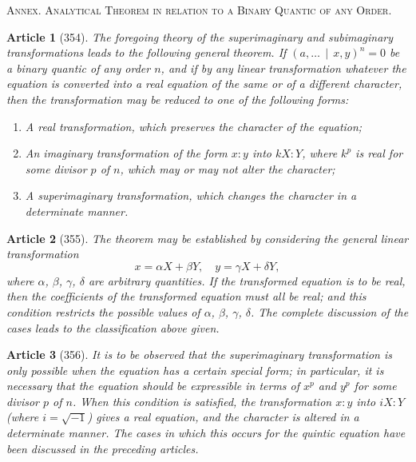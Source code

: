 \documentclass[11pt,a4paper]{article}
\theoremstyle{cayley}
\newtheorem{art}{Article}
\begin{document}
\begin{center}
\textsc{Annex. Analytical Theorem in relation to a Binary Quantic of any Order.}
\end{center}

\begin{art}[354]
The foregoing theory of the superimaginary and subimaginary transformations leads to the following general theorem. If $(a, \ldots \,\mid\, x, y)^n = 0$ be a binary quantic of any order $n$, and if by any linear transformation whatever the equation is converted into a real equation of the same or of a different character, then the transformation may be reduced to one of the following forms:
\begin{enumerate}[label=\arabic*.,itemsep=2pt]
\item A real transformation, which preserves the character of the equation;
\item An imaginary transformation of the form $x:y$ into $kX:Y$, where $k^p$ is real for some divisor $p$ of $n$, which may or may not alter the character;
\item A superimaginary transformation, which changes the character in a determinate manner.
\end{enumerate}
\end{art}

\begin{art}[355]
The theorem may be established by considering the general linear transformation
\[
x = \alpha X + \beta Y, \quad y = \gamma X + \delta Y,
\]
where $\alpha$, $\beta$, $\gamma$, $\delta$ are arbitrary quantities. If the transformed equation is to be real, then the coefficients of the transformed equation must all be real; and this condition restricts the possible values of $\alpha$, $\beta$, $\gamma$, $\delta$. The complete discussion of the cases leads to the classification above given.
\end{art}

\begin{art}[356]
It is to be observed that the superimaginary transformation is only possible when the equation has a certain special form; in particular, it is necessary that the equation should be expressible in terms of $x^p$ and $y^p$ for some divisor $p$ of $n$. When this condition is satisfied, the transformation $x:y$ into $iX:Y$ (where $i = \sqrt{-1}$) gives a real equation, and the character is altered in a determinate manner. The cases in which this occurs for the quintic equation have been discussed in the preceding articles.
\end{art}
\end{document}
